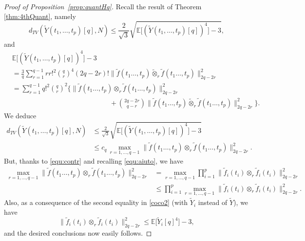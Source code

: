 \documentclass[10pt,a4paper]{amsart}
\newcommand{\E}{\mathbb{E}}
\begin{document}
\begin{proof}[Proof of Proposition~\ref{prop:quantHq}]
    Recall the result of Theorem \ref{thm:4thQuant}, namely
    \begin{equation}\label{coco}
    d_{TV}(\widetilde Y{(t_1,\ldots,t_p)}[q],N)\le \frac{2}{\sqrt{3}} \sqrt{\E\big[(\widetilde Y{(t_1,\ldots,t_p)}[q])^4\big]-3},
    \end{equation}
    and
    \begin{align}
        & \E\big[(\widetilde Y{(t_1,\ldots,t_p)}[q])^4\big]-3 \label{coco2}\\
        & = \frac3q\sum_{r=1}^{q-1} rr!^2\binom{q}{r}^4(2q-2r)!
\|\widetilde f(t_1\ldots,t_p)\widetilde{\otimes}_r \widetilde f(t_1\ldots,t_p)\|^2_{2q-2r}\\
        &= \sum_{r=1}^{q-1} q!^2\binom{q}{r}^2\bigg\{\|\widetilde f(t_1\ldots,t_p)\otimes_r \widetilde f(t_1\ldots,t_p)\|^2_{2q-2r} \\
        & \hspace{6cm}
        +\binom{2q-2r}{q-r}\|\widetilde f(t_1\ldots,t_p)\widetilde{\otimes}_r \widetilde f(t_1\ldots,t_p)\|^2_{2q-2r}\bigg\}.
    \end{align}
    We deduce 
    \begin{align}
         d_{TV}(\widetilde Y{(t_1,\ldots,t_p)}[q],N)
        &\le \frac{2}{\sqrt{3}} \sqrt{\E\big[(\widetilde Y{(t_1,\ldots,t_p)}[q])^4\big]-3}\\
        &\le c_q\,\max_{r=1,\ldots,q-1} \|\widetilde f(t_1\ldots,t_p)\otimes_r  \widetilde  f(t_1\ldots,t_p)\|^2_{2q-2r}.
    \end{align}
    But, thanks to \eqref{equ:contr} and recalling \eqref{equ:aiuto}, 
   we have 
    \begin{align}
        \max_{r=1,\ldots,q-1} \|\widetilde f(t_1\ldots,t_p)\otimes_r  \widetilde  f(t_1\ldots,t_p)\|^2_{2q-2r}
        &= \max_{r=1,\ldots,q-1} \prod_{i=1}^p \|\widetilde f_i(t_i)\otimes_r \widetilde f_i(t_i)\|^2_{2q-2r}\\
        &\le  \prod_{i=1}^p \max_{r=1,\ldots,q-1} \|\widetilde f_i(t_i)\otimes_r \widetilde f_i(t_i)\|^2_{2q-2r}.
    \end{align}
    Also, as a consequence of the second equality in \eqref{coco2} (with $\widetilde{Y}_i$ instead of $\widetilde{Y}$), we have
    $$
    \|\widetilde f_i(t_i)\otimes_r \widetilde f_i(t_i)\|^2_{2q-2r} \leq \E\big[\widetilde Y_i[q]^4\big]-3,
    $$
    and the desired conclusions now easily follows.
\end{proof}
\end{document}
